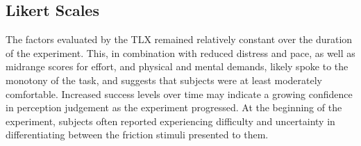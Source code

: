 \documentclass [12pt,letterpaper]{report}
\newcommand{\dan}[2][0pt]{\pdfcomment[avatar=dan,hoffset=#1,voffset=-6pt,opacity=.4]{#2}}
\newcommand{\jer}[2][0pt]{\pdfcomment[avatar=jer,hoffset=#1,voffset=6pt,opacity=.4]{#2}}
\begin{document}



\subsection{Likert Scales}

The factors evaluated by the TLX remained relatively constant over the duration of the experiment. This, in combination with reduced distress and pace, as well as midrange scores for effort, and physical and mental demands, likely spoke to the monotony of the task, and suggests that subjects were at least moderately comfortable. Increased success levels over time may indicate a growing confidence in perception judgement as the experiment progressed. At the beginning of the experiment, subjects often reported experiencing difficulty and uncertainty in differentiating between the friction stimuli presented to them.
\end{document}
